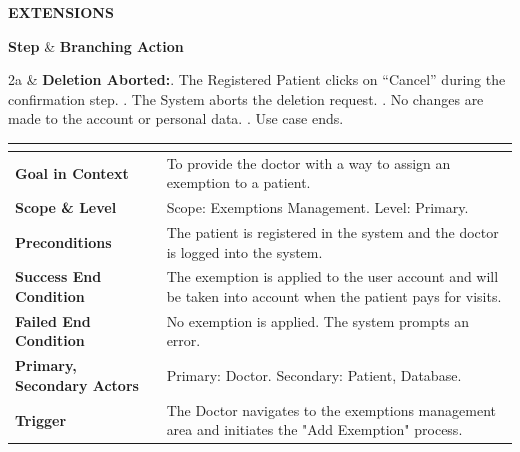 \documentclass[12pt, a4paper]{article}
\newcommand{\usecaseheader}[9]{
    \vspace{0.5cm}
    \noindent
    \renewcommand{\arraystretch}{1.5}
    \begin{tabularx}{\textwidth}{|>{\columncolor{gray!20}\bfseries}p{4.5cm}|X|}
    \hline
    \rowcolor{blue!10}
    \multicolumn{2}{|c|}{\textbf{USE CASE #1: #2}} \\ \hline
    Goal in Context & #3 \\ \hline
    Scope \& Level & #4 \\ \hline
    Preconditions & #5 \\ \hline
    Success End Condition & #6 \\ \hline
    Failed End Condition & #7 \\ \hline
    Primary, Secondary Actors & #8 \\ \hline
    Trigger & #9 \\ \hline
    \end{tabularx}
    \par\vspace{0.2cm}
}
\newenvironment{ucextensions}{
    \noindent\textbf{EXTENSIONS} \par \vspace{0.1cm}
    \noindent
    \renewcommand{\arraystretch}{1.3}
    \tabularx{\textwidth}{|>{\centering\arraybackslash}p{1.2cm}|X|}
    \hline
    \rowcolor{gray!30}
    \textbf{Step} & \textbf{Branching Action} \\ \hline
}{
    \endtabularx
    \par\vspace{0.3cm}
}
\begin{document}
\begin{ucextensions}
    2a & \textbf{Deletion Aborted:}. The Registered Patient clicks on ``Cancel'' during the confirmation step. . The System aborts the deletion request. . No changes are made to the account or personal data. . Use case ends. \\ \hline
\end{ucextensions}

{}
\usecaseheader
  {UC34} %
  {Exemption creation by doctor} %
  {To provide the doctor with a way to assign an exemption to a patient.} %
  {Scope: Exemptions Management. Level: Primary.} %
  {The patient is registered in the system and the doctor is logged into the system.} %
  {The exemption is applied to the user account and will be taken into account when the patient pays for visits.} %
  {No exemption is applied. The system prompts an error.} %
  {Primary: Doctor. Secondary: Patient, Database.} %
  {The Doctor navigates to the exemptions management area and initiates the "Add Exemption" process.} %
\end{document}
